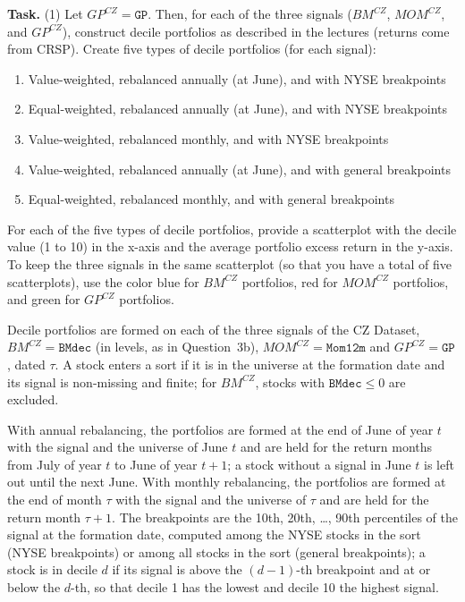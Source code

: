\documentclass[11pt]{article}
\makeatletter
\newcommand{\MOM}{\mathit{MOM}}
\newcommand{\BM}{\mathit{BM}}
\newcommand{\GP}{\mathit{GP}}
\newcommand{\task}[1]{\par\if@nobreak\else\needspace{5\baselineskip}\fi\medskip\noindent
  \begin{minipage}{\linewidth}\textbf{Task.} #1\end{minipage}\par   %
  \nopagebreak\medskip\@afterheading}   %
\makeatother
\begin{document}
\task{(1) Let $\GP^{CZ} = \texttt{GP}$. Then, for each of the three signals ($\BM^{CZ}$,
$\MOM^{CZ}$, and $\GP^{CZ}$), construct decile portfolios as described in the lectures
(returns come from CRSP). Create five types of decile portfolios (for each signal):
\begin{enumerate}[label=(\roman*), nosep, leftmargin=2.5em]
  \item Value-weighted, rebalanced annually (at June), and with NYSE breakpoints
  \item Equal-weighted, rebalanced annually (at June), and with NYSE breakpoints
  \item Value-weighted, rebalanced monthly, and with NYSE breakpoints
  \item Value-weighted, rebalanced annually (at June), and with general breakpoints
  \item Equal-weighted, rebalanced monthly, and with general breakpoints
\end{enumerate}
For each of the five types of decile portfolios, provide a scatterplot with the decile value
(1 to 10) in the x-axis and the average portfolio excess return in the y-axis. To keep the
three signals in the same scatterplot (so that you have a total of five scatterplots), use the
color blue for $\BM^{CZ}$ portfolios, red for $\MOM^{CZ}$ portfolios, and green for
$\GP^{CZ}$ portfolios.}

Decile portfolios are formed on each of the three signals of the CZ Dataset,
$\BM^{CZ} = \texttt{BMdec}$ (in levels, as in Question~3b), $\MOM^{CZ} = \texttt{Mom12m}$ and
$\GP^{CZ} = \texttt{GP}$, dated $\tau$. A stock enters a sort if it is in the universe at the
formation date and its signal is non-missing and finite; for $\BM^{CZ}$, stocks with
$\texttt{BMdec} \le 0$ are excluded.

With annual rebalancing, the portfolios are formed at the end of June of year $t$ with the
signal and the universe of June $t$ and are held for the return months from July of year $t$
to June of year $t+1$; a stock without a signal in June $t$ is left out until the next June.
With monthly rebalancing, the portfolios are formed at the end of month $\tau$ with the signal
and the universe of $\tau$ and are held for the return month $\tau+1$. The breakpoints are the
10th, 20th, \dots, 90th percentiles of the signal at the formation date, computed among the
NYSE stocks in the sort (NYSE breakpoints) or among all stocks in the sort (general
breakpoints); a stock is in decile $d$ if its signal is above the $(d-1)$-th breakpoint and
at or below the $d$-th, so that decile 1 has the lowest and decile 10 the highest signal.
\end{document}
